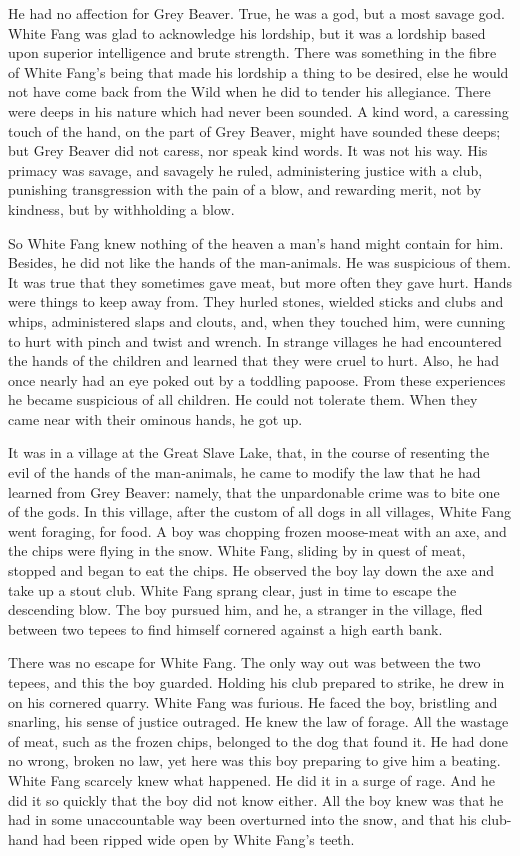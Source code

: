 \documentclass[10pt]{book}
\begin{document}
He had no affection for Grey Beaver. True, he was a god, but a most
savage god. White Fang was glad to acknowledge his lordship, but it was
a lordship based upon superior intelligence and brute strength. There
was something in the fibre of White Fang’s being that made his lordship
a thing to be desired, else he would not have come back from the Wild
when he did to tender his allegiance. There were deeps in his nature
which had never been sounded. A kind word, a caressing touch of the
hand, on the part of Grey Beaver, might have sounded these deeps; but
Grey Beaver did not caress, nor speak kind words. It was not his way.
His primacy was savage, and savagely he ruled, administering justice
with a club, punishing transgression with the pain of a blow, and
rewarding merit, not by kindness, but by withholding a blow.

So White Fang knew nothing of the heaven a man’s hand might contain for
him. Besides, he did not like the hands of the man-animals. He was
suspicious of them. It was true that they sometimes gave meat, but more
often they gave hurt. Hands were things to keep away from. They hurled
stones, wielded sticks and clubs and whips, administered slaps and
clouts, and, when they touched him, were cunning to hurt with pinch and
twist and wrench. In strange villages he had encountered the hands of
the children and learned that they were cruel to hurt. Also, he had
once nearly had an eye poked out by a toddling papoose. From these
experiences he became suspicious of all children. He could not tolerate
them. When they came near with their ominous hands, he got up.

It was in a village at the Great Slave Lake, that, in the course of
resenting the evil of the hands of the man-animals, he came to modify
the law that he had learned from Grey Beaver: namely, that the
unpardonable crime was to bite one of the gods. In this village, after
the custom of all dogs in all villages, White Fang went foraging, for
food. A boy was chopping frozen moose-meat with an axe, and the chips
were flying in the snow. White Fang, sliding by in quest of meat,
stopped and began to eat the chips. He observed the boy lay down the
axe and take up a stout club. White Fang sprang clear, just in time to
escape the descending blow. The boy pursued him, and he, a stranger in
the village, fled between two tepees to find himself cornered against a
high earth bank.

There was no escape for White Fang. The only way out was between the
two tepees, and this the boy guarded. Holding his club prepared to
strike, he drew in on his cornered quarry. White Fang was furious. He
faced the boy, bristling and snarling, his sense of justice outraged.
He knew the law of forage. All the wastage of meat, such as the frozen
chips, belonged to the dog that found it. He had done no wrong, broken
no law, yet here was this boy preparing to give him a beating. White
Fang scarcely knew what happened. He did it in a surge of rage. And he
did it so quickly that the boy did not know either. All the boy knew
was that he had in some unaccountable way been overturned into the
snow, and that his club-hand had been ripped wide open by White Fang’s
teeth.
\end{document}
